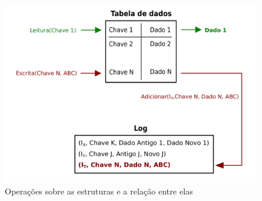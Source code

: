 \documentclass[11pt,twoside,a4paper]{book}
\begin{document}
\begin{figure}
  \centering
  \includegraphics[width=.90\textwidth]{estruturas} 
  \caption{Operações sobre as estruturas e a relação entre elas}
  \label{fig:estruturas} 
\end{figure}


\end{document}
